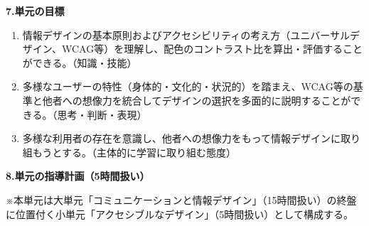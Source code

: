 \documentclass[uplatex,a4paper,11pt]{jsarticle}
\newcommand{\itemhead}[2]{\par\medskip\noindent\textbf{#1.\quad #2}\par\nopagebreak\smallskip}
\begin{document}
\itemhead{7}{単元の目標}
\begin{enumerate}[label=(\arabic*),leftmargin=2.8em,itemsep=3pt,topsep=2pt]
  \item 情報デザインの基本原則およびアクセシビリティの考え方（ユニバーサルデザイン、WCAG等）を理解し、配色のコントラスト比を算出・評価することができる。（知識・技能）
  \item 多様なユーザーの特性（身体的・文化的・状況的）を踏まえ、WCAG等の基準と他者への想像力を統合してデザインの選択を多面的に説明することができる。（思考・判断・表現）
  \item 多様な利用者の存在を意識し、他者への想像力をもって情報デザインに取り組もうとする。（主体的に学習に取り組む態度）
\end{enumerate}

\itemhead{8}{単元の指導計画（5時間扱い）}
\nopagebreak
\hspace{1zw}※本単元は大単元「コミュニケーションと情報デザイン」（15時間扱い）の終盤に位置付く小単元「アクセシブルなデザイン」（5時間扱い）として構成する。\par
\smallskip
\end{document}
